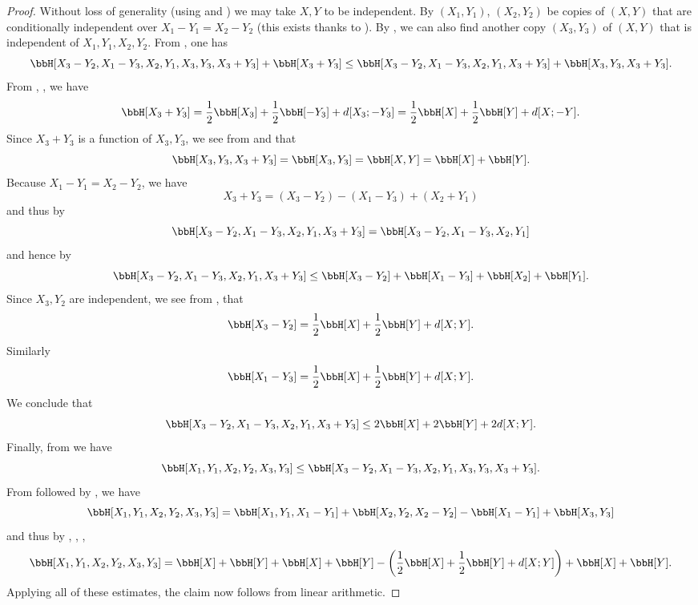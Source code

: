 \begin{proof}\leanok
Without loss of generality (using  and ) we may take $X,Y$ to be independent.
By $(X_1,Y_1)$, $(X_2,Y_2)$ be copies of $(X,Y)$ that are conditionally independent over $X_1-Y_1=X_2-Y_2$ (this exists thanks to ).  By , we can also find another copy $(X_3,Y_3)$ of $(X,Y)$ that is independent of $X_1,Y_1,X_2,Y_2$.  From , one has
$$ \bbH[X_3-Y_2, X_1-Y_3, X_2, Y_1, X_3, Y_3, X_3+Y_3] + \bbH[X_3+Y_3] \leq \bbH[X_3-Y_2, X_1-Y_3, X_2, Y_1, X_3+Y_3] + \bbH[X_3, Y_3, X_3+Y_3].$$
From , ,  we have
$$ \bbH[X_3+Y_3] = \frac{1}{2} \bbH[X_3] + \frac{1}{2} \bbH[-Y_3] + d[X_3;-Y_3] = \frac{1}{2} \bbH[X] + \frac{1}{2} \bbH[Y] + d[X;-Y].$$
Since $X_3+Y_3$ is a function of $X_3,Y_3$, we see from  and  that
$$ \bbH[X_3,Y_3,X_3+Y_3] = \bbH[X_3,Y_3] = \bbH[X,Y] = \bbH[X]+\bbH[Y].$$
Because $X_1-Y_1=X_2-Y_2$, we have
$$ X_3+Y_3 = (X_3-Y_2) - (X_1-Y_3) + (X_2+Y_1)$$
and thus by 
$$ \bbH[X_3-Y_2, X_1-Y_3, X_2, Y_1, X_3+Y_3] = \bbH[X_3-Y_2, X_1-Y_3, X_2, Y_1]$$
and hence by 
$$ \bbH[X_3-Y_2, X_1-Y_3, X_2, Y_1, X_3+Y_3] \leq \bbH[X_3-Y_2] + \bbH[X_1-Y_3] + \bbH[X_2] + \bbH[Y_1].$$
Since $X_3,Y_2$ are independent, we see from ,  that
$$\bbH[X_3-Y_2] = \frac{1}{2} \bbH[X] + \frac{1}{2} \bbH[Y] + d[X; Y].$$
Similarly
$$ \bbH[X_1-Y_3] = \frac{1}{2} \bbH[X] + \frac{1}{2} \bbH[Y] + d[X; Y].$$
We conclude that
$$ \bbH[X_3-Y_2, X_1-Y_3, X_2, Y_1, X_3+Y_3] \leq 2\bbH[X] + 2\bbH[Y] + 2d[X; Y].$$
Finally, from  we have
$$ \bbH[X_1,Y_1,X_2,Y_2,X_3,Y_3] \leq \bbH[X_3-Y_2, X_1-Y_3, X_2, Y_1, X_3, Y_3, X_3+Y_3].$$
From  followed by , we have
$$\bbH[X_1,Y_1,X_2,Y_2,X_3,Y_3] = \bbH[X_1,Y_1,X_1-Y_1] + \bbH[X_2,Y_2,X_2-Y_2] - \bbH[X_1-Y_1] + \bbH[X_3,Y_3]$$
and thus by , , , 
$$\bbH[X_1,Y_1,X_2,Y_2,X_3,Y_3] = \bbH[X] + \bbH[Y] + \bbH[X] + \bbH[Y] -\left(\frac{1}{2}\bbH[X] + \frac{1}{2}\bbH[Y] + d[X; Y]\right) + \bbH[X] + \bbH[Y].$$
Applying all of these estimates, the claim now follows from linear arithmetic.
\end{proof}

